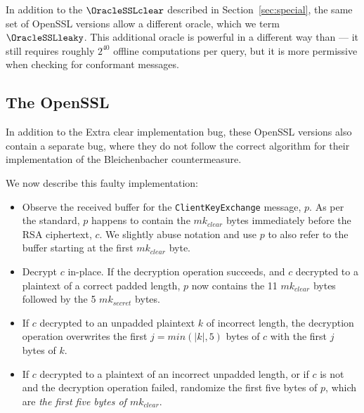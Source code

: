 In addition to the \tOracleSSLclear $\OracleSSLclear$ described in Section~\ref{sec:special},
the same set of OpenSSL versions allow a different oracle,
which we term \tOracleSSLleaky $\OracleSSLleaky$.
This additional oracle is powerful in a different way than
\tOracleSSLclear --- it still requires roughly $2^{40}$ offline computations
per query, but it is more permissive when checking for conformant messages.

\subsection{The OpenSSL \tOracleSSLleaky}
In addition to the Extra clear implementation bug, these OpenSSL versions
also contain a separate bug, where they do not follow the correct algorithm
for their implementation of the Bleichenbacher countermeasure.

We now describe this faulty implementation:
\begin{itemize}
	\item Observe the received buffer for the \texttt{ClientKeyExchange} message, $p$.
	As per the \ssltwo standard, $p$ happens to contain the $mk_{clear}$
	bytes immediately before the RSA ciphertext, $c$.
	We slightly abuse notation and use $p$ to also refer to the buffer starting at the first
	$mk_{clear}$ byte.

	\item Decrypt $c$ in-place. If the decryption operation succeeds,
	and $c$ decrypted to a plaintext of a correct padded length,
	$p$ now contains the 11 $mk_{clear}$ bytes followed by the 5
	$mk_{secret}$ bytes.

	\item If $c$ decrypted to an unpadded plaintext $k$ of incorrect length,
	the decryption operation overwrites the first $j = min(|k|, 5)$ bytes
	of $c$ with the first $j$ bytes of $k$.

	\item If $c$ decrypted to a plaintext of an incorrect unpadded length,
	or if $c$ is not \sslconform and the decryption operation failed,
	randomize the first five bytes of $p$, which are \textit{the first
	five bytes of $mk_{clear}$}.
\end{itemize}

